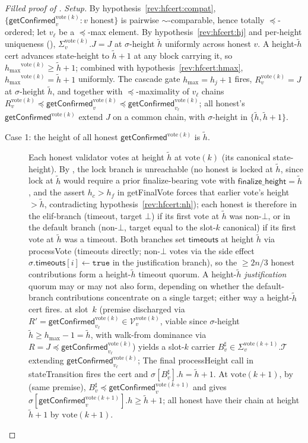 \documentclass{article}
\newcommand{\T}[0]{\ensuremath{\mathcal{T}}}
\newcommand{\V}[0]{\ensuremath{\mathcal{V}}}
\newcommand{\finalizeHeight}{\mathsf{finalize\_height}}
\newcommand{\timeouts}{\mathsf{timeouts}}
\newcommand{\hmax}{\ensuremath{h_{\max}}\xspace}
\newcommand{\stateTransition}{\textsf{stateTransition}\xspace}
\newcommand{\processHeight}{\textsf{processHeight}\xspace}
\newcommand{\processVote}{\textsf{processVote}\xspace}
\newcommand{\vote}{\ensuremath{\mathrm{vote}}}
\newcommand{\comm}[1]{\ensuremath{\widetilde{#1}}}
\newcommand{\getFinalVote}{\textsf{getFinalVote}\xspace}
\newcommand{\getConfirmed}{\textsf{getConfirmed}\xspace}
\theoremstyle{plain}
\theoremstyle{definition}
\theoremstyle{remark}
\begin{document}
\begin{proof}[Filled proof of ]
\emph{Setup.}
By hypothesis~\ref{rev:hfcert:compat}, $\{\getConfirmed_v^{\vote(k)} : v \text{ honest}\}$ is pairwise $\sim$-comparable, hence totally $\preceq$-ordered; let $v_\ell$ be a $\preceq$-max element.
By hypothesis~\ref{rev:hfcert:hj} and per-height uniqueness (), $\Sigma_v^{\vote(k)}.J = J$ at $\sigma$-height $\comm{h}$ uniformly across honest $v$.
A height-$\comm{h}$ cert advances state-height to $\comm{h}+1$ at any block carrying it, so $\hmax^{\vote(k)} \geq \comm{h}+1$;
combined with hypothesis~\ref{rev:hfcert:hmax}, $\hmax^{\vote(k)} = \comm{h}+1$ uniformly.
The cascade gate $\hmax = h_j+1$ fires, $R_v^{\vote(k)} = J$ at $\sigma$-height $\comm{h}$, and  together with $\preceq$-maximality of $v_\ell$ chains $R_v^{\vote(k)} \preceq \getConfirmed_v^{\vote(k)} \preceq \getConfirmed_{v_\ell}^{\vote(k)}$;
all honest's $\getConfirmed^{\vote(k)}$ extend $J$ on a common chain, with $\sigma$-height in $\{\comm{h}, \comm{h}+1\}$.

\begin{description}
  \item[Case 1: the height of all honest $\getConfirmed^{\vote(k)}$ is $\comm{h}$.]
  Each honest validator votes at height $\comm{h}$ at $\vote(k)$ (its canonical state-height).
  By , the lock branch is unreachable (no honest is locked at $\comm{h}$, since lock at $\comm{h}$ would require a prior finalize-bearing vote with $\finalizeHeight = \comm{h}$, and the assert $h_c > h_f$ in \getFinalVote{} forces that earlier vote's height $> \comm{h}$, contradicting hypothesis~\ref{rev:hfcert:nh});
  each honest is therefore in the elif-branch (timeout, target $\bot$) if its first vote at $\comm{h}$ was non-$\bot$, or in the default branch (non-$\bot$, target equal to the slot-$k$ canonical) if its first vote at $\comm{h}$ was a timeout.
  Both branches set $\timeouts$ at height $\comm{h}$ via \processVote{} (timeouts directly; non-$\bot$ votes via the side effect $\sigma.\timeouts[i] \gets \mathtt{true}$ in the justification branch), so the $\geq 2n/3$ honest contributions form a height-$\comm{h}$ timeout quorum.
  A height-$\comm{h}$ \emph{justification} quorum may or may not also form, depending on whether the default-branch contributions concentrate on a single target; either way a height-$\comm{h}$ cert fires.
   at slot~$k$ (premise discharged via $R' = \getConfirmed_{v_\ell}^{\vote(k)} \in \V_v^{\vote(k)}$, viable since $\sigma$-height $\comm{h} \geq \hmax-1 = \comm{h}$, with walk-from dominance via $R = J \preceq \getConfirmed_{v_\ell}^{\vote(k)}$) yields a slot-$k$ carrier $B^\sharp_v \in \Sigma_v^{\vote(k+1)}.\T$ extending $\getConfirmed_{v_\ell}^{\vote(k)}$;
  The final \processHeight{} call in \stateTransition{} fires the cert and $\sigma[B^\sharp_v].h = \comm{h}+1$.
  At $\vote(k+1)$, by  (same premise), $B^\sharp_v \preceq \getConfirmed_v^{\vote(k+1)}$ and  gives $\sigma[\getConfirmed_v^{\vote(k+1)}].h \geq \comm{h}+1$;
  all honest have their chain at height $\comm{h}+1$ by $\vote(k+1)$.


\end{description}
\end{proof}
\end{document}
